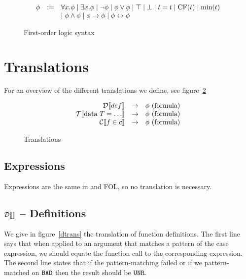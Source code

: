 \documentclass[preprint]{sigplanconf}
\begin{document}
\begin{figure}
 \centering
  \[  \begin{array}{rcl}
    \phi &:=& \forall x.\phi \mid \exists x.\phi \mid \lnot \phi \mid \phi \lor \phi \mid \top \mid \bot \mid t=t \mid \mbox{CF}(t) \mid \mbox{min}(t) \\
    && \mid \phi \land \phi \mid \phi \to \phi \mid \phi \leftrightarrow \phi
  \end{array} \]
  \caption{First-order logic syntax}
  \label{fol-stx}
\end{figure}


\section{Translations}
For an overview of the different translations we define, see figure~\ref{trans}

\begin{figure}
 \begin{center}
  \[  \begin{array}{rcl}
    \mathcal{D} \llbracket def \rrbracket &\to& \phi~(\mbox{formula}) \\
    \mathcal{T} \llbracket \mbox{data } T = \dots \rrbracket &\to& \phi~(\mbox{formula}) \\
    \mathcal{C} \llbracket f \in c \rrbracket &\to& \phi~(\mbox{formula}) \\
  \end{array} \]
  \end{center}
  \caption{Translations}
  \label{trans}
\end{figure}


\subsection{Expressions}
Expressions are the same in \hprime and FOL, so no translation is
necessary.

\subsection{$\mathcal{D} \llbracket  \rrbracket$ -- Definitions}
We give in figure~\ref{dtrans} the translation of function
definitions. The first line says that when applied to an argument that
matches a pattern of the case expression, we should equate the
function call to the corresponding expression. The second line states
that if the pattern-matching failed or if we pattern-matched on $\texttt{BAD}$
then the result should be $\texttt{UNR}$.
\end{document}
